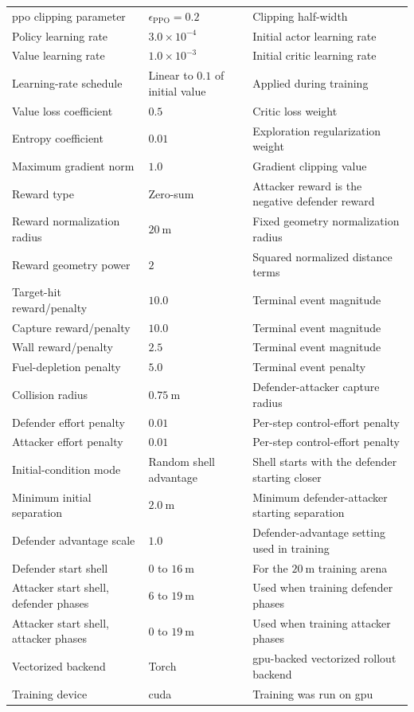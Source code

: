 \begin{longtable}{@{}p{}p{}p{}@{}}
 \acs{ppo} clipping parameter & $\epsilon_{\mathrm{PPO}}=0.2$ & Clipping half-width \\
Policy learning rate & $3.0\times10^{-4}$ & Initial actor learning rate \\
Value learning rate & $1.0\times10^{-3}$ & Initial critic learning rate \\
Learning-rate schedule & Linear to $0.1$ of initial value & Applied during training \\
Value loss coefficient & $0.5$ & Critic loss weight \\
Entropy coefficient & $0.01$ & Exploration regularization weight \\
Maximum gradient norm & $1.0$ & Gradient clipping value \\
Reward type & Zero-sum & Attacker reward is the negative defender reward \\
Reward normalization radius & $20~\mathrm{m}$ & Fixed geometry normalization radius \\
Reward geometry power & $2$ & Squared normalized distance terms \\
Target-hit reward/penalty & $10.0$ & Terminal event magnitude \\
Capture reward/penalty & $10.0$ & Terminal event magnitude \\
Wall reward/penalty & $2.5$ & Terminal event magnitude \\
Fuel-depletion penalty & $5.0$ & Terminal event penalty \\
Collision radius & $0.75~\mathrm{m}$ & Defender-attacker capture radius \\
Defender effort penalty & $0.01$ & Per-step control-effort penalty \\
Attacker effort penalty & $0.01$ & Per-step control-effort penalty \\
Initial-condition mode & Random shell advantage & Shell starts with the defender starting closer \\
Minimum initial separation & $2.0~\mathrm{m}$ & Minimum defender-attacker starting separation \\
Defender advantage scale & $1.0$ & Defender-advantage setting used in training \\
Defender start shell & $0$ to $16~\mathrm{m}$ & For the $20~\mathrm{m}$ training arena \\
Attacker start shell, defender phases & $6$ to $19~\mathrm{m}$ & Used when training defender phases \\
Attacker start shell, attacker phases & $0$ to $19~\mathrm{m}$ & Used when training attacker phases \\
Vectorized backend & Torch & \acs{gpu}-backed vectorized rollout backend \\
Training device & \acs{cuda} & Training was run on \acs{gpu} \\
\end{longtable}


